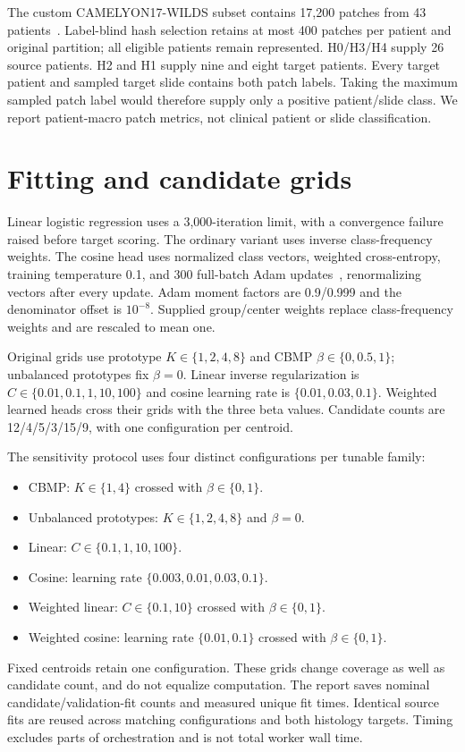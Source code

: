 \documentclass[10pt,letterpaper]{article}
\begin{document}
The custom CAMELYON17-WILDS subset contains 17,200 patches from 43 patients~\cite{bandi2019camelyon,koh2021wilds}. Label-blind hash selection retains at most 400 patches per patient and original partition; all eligible patients remain represented. H0/H3/H4 supply 26 source patients. H2 and H1 supply nine and eight target patients. Every target patient and sampled target slide contains both patch labels. Taking the maximum sampled patch label would therefore supply only a positive patient/slide class. We report patient-macro patch metrics, not clinical patient or slide classification.

\section{Fitting and candidate grids}
Linear logistic regression uses a 3,000-iteration limit, with a convergence failure raised before target scoring. The ordinary variant uses inverse class-frequency weights. The cosine head uses normalized class vectors, weighted cross-entropy, training temperature 0.1, and 300 full-batch Adam updates~\cite{kingma2015adam}, renormalizing vectors after every update. Adam moment factors are 0.9/0.999 and the denominator offset is $10^{-8}$. Supplied group/center weights replace class-frequency weights and are rescaled to mean one.

Original grids use prototype $K\in\{1,2,4,8\}$ and CBMP $\beta\in\{0,0.5,1\}$; unbalanced prototypes fix $\beta=0$. Linear inverse regularization is $C\in\{0.01,0.1,1,10,100\}$ and cosine learning rate is $\{0.01,0.03,0.1\}$. Weighted learned heads cross their grids with the three beta values. Candidate counts are 12/4/5/3/15/9, with one configuration per centroid.

The sensitivity protocol uses four distinct configurations per tunable family:
\begin{itemize}
\item CBMP: $K\in\{1,4\}$ crossed with $\beta\in\{0,1\}$.
\item Unbalanced prototypes: $K\in\{1,2,4,8\}$ and $\beta=0$.
\item Linear: $C\in\{0.1,1,10,100\}$.
\item Cosine: learning rate $\{0.003,0.01,0.03,0.1\}$.
\item Weighted linear: $C\in\{0.1,10\}$ crossed with $\beta\in\{0,1\}$.
\item Weighted cosine: learning rate $\{0.01,0.1\}$ crossed with $\beta\in\{0,1\}$.
\end{itemize}
Fixed centroids retain one configuration. These grids change coverage as well as candidate count, and do not equalize computation. The report saves nominal candidate/validation-fit counts and measured unique fit times. Identical source fits are reused across matching configurations and both histology targets. Timing excludes parts of orchestration and is not total worker wall time.
\end{document}
